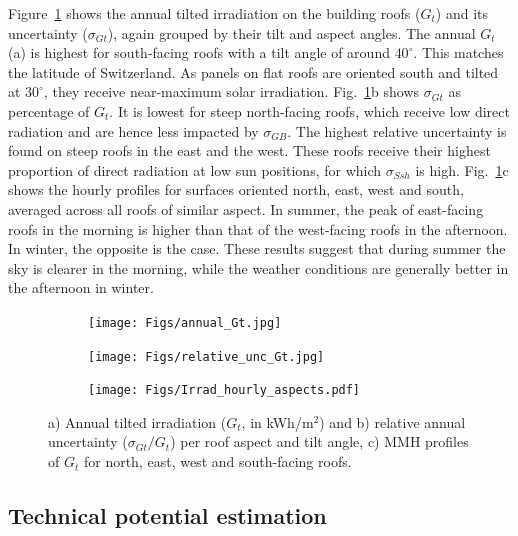 Figure~\ref{fig:Gt} shows the annual tilted irradiation on the building roofs ($G_t$) and its uncertainty ($\sigma_{Gt}$), again grouped by their tilt and aspect angles. The annual $G_t$ (a) is highest for south-facing roofs with a tilt angle of around $40^\circ$. This matches the latitude of Switzerland. As panels on flat roofs are oriented south and tilted at $30^\circ$, they receive near-maximum solar irradiation.
Fig.~\ref{fig:Gt}b shows $\sigma_{Gt}$ as percentage of $G_t$. It is lowest for steep north-facing roofs, which receive low direct radiation and are hence less impacted by $\sigma_{GB}$. 
The highest relative uncertainty is found on steep roofs in the east and the west. 
These roofs receive their highest proportion of direct radiation at low sun positions, for which $\sigma_{\mathit{Ssh}}$ is high.
%
Fig.~\ref{fig:Gt}c shows the hourly profiles for surfaces oriented north, east, west and south, averaged across all roofs of similar aspect. In summer, the peak of east-facing roofs in the morning is higher than that of the west-facing roofs in the afternoon. In winter, the opposite is the case. 
These results suggest that during summer the sky is clearer in the morning, while the weather conditions are generally better in the afternoon in winter. 

\begin{figure}[tb]
\centering
\begin{subfigure}{.49\textwidth}
  \centering
  \texttt{[image: Figs/annual\_Gt.jpg]}  
  \subcaption{}
\end{subfigure}
\begin{subfigure}{.49\textwidth}
  \centering
  \texttt{[image: Figs/relative\_unc\_Gt.jpg]}  
  \subcaption{}
\end{subfigure}
\begin{subfigure}{.9\textwidth}
  \centering
  \texttt{[image: Figs/Irrad\_hourly\_aspects.pdf]} 
  \subcaption{}
\end{subfigure}
\caption{a) Annual tilted irradiation ($G_t$, in kWh/m$^2$) and b) relative annual uncertainty ($\sigma_{Gt} / G_t$) per roof aspect and tilt angle, c) MMH profiles of $G_t$ for north, east, west and south-facing roofs.}
\label{fig:Gt}
\end{figure}


\subsection{Technical potential estimation}
\label{solar_tech}

